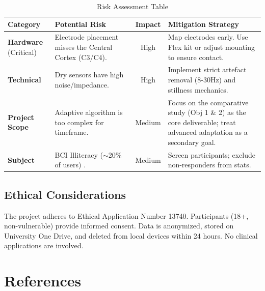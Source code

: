 \documentclass[a4paper, 11pt, openany]{report}
\let\cite\citep
\begin{document}
        \begin{table}[h!]
            \centering
            \caption{Risk Assessment Table}
            \vspace{0.2cm}
            \renewcommand{\arraystretch}{1.3} 
            \begin{tabular}{@{} p{} p{} c p{} @{}} 
            \toprule
          
            \textbf{Category} & \textbf{Potential Risk} & \textbf{Impact} & \textbf{Mitigation Strategy} \\ 
            \midrule
            
            \textbf{Hardware} \newline (Critical) & 
            Electrode placement misses the Central Cortex (C3/C4). & 
            High & 
            Map electrodes early. Use Flex kit or adjust mounting to ensure contact. \\ 
            \addlinespace 
            
            \textbf{Technical} & 
            Dry sensors have high noise/impedance. & 
            High & 
            Implement strict artefact removal (8-30Hz) and stillness mechanics. \\ 
            \addlinespace
            
            \textbf{Project Scope} & 
            Adaptive algorithm is too complex for timeframe. & 
            Medium & 
            Focus on the comparative study (Obj 1 \& 2) as the core deliverable; 
            treat advanced adaptation as a secondary goal. \\ 
            \addlinespace
            
            \textbf{Subject} & 
            BCI Illiteracy ($\sim$20\% of users) \cite{Blankertz2010}. & 
            Medium & 
            Screen participants; exclude non-responders from stats. \\ 
            
            \bottomrule
            \end{tabular}
        \end{table}

    \newpage

    \section{Ethical Considerations}
    The project adheres to Ethical Application Number 13740. Participants 
    (18+, non-vulnerable) provide informed consent. Data is anonymized, stored 
    on University One Drive, and deleted from local devices within 24 hours. No 
    clinical applications are involved.


\newpage
\vspace*{-1cm}
\chapter*{References}
\renewcommand{\bibname}{\vspace{-1cm}}


\end{document}
